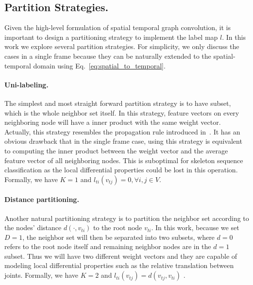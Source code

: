 \documentclass[letterpaper]{article} \usepackage{aaai18}  \usepackage{times}  \usepackage{helvet}  \usepackage{courier}  \usepackage{url}  \usepackage{graphicx}
\begin{document}
\subsection{Partition Strategies.}\label{sec:partition}
Given the high-level formulation of spatial temporal graph convolution, it is important to design a partitioning strategy to implement the label map $ l $.
In this work we explore several partition strategies.
For simplicity, we only discuss the cases in a single frame because they can be naturally extended to the spatial-temporal domain using Eq.~\ref{eq:spatial_to_temporal}.

\paragraph{Uni-labeling.}
The simplest and most straight forward partition strategy is to have subset, which is the whole neighbor set itself.
In this strategy, feature vectors on every neighboring node will have a inner product with the same weight vector. 
Actually, this strategy resembles the propagation rule introduced in~\cite{Kipf2017ICLR}.
It has an obvious drawback that in the single frame case, using this strategy is equivalent to computing the inner product between the weight vector and the average feature vector of all neighboring nodes. 
This is suboptimal for skeleton sequence classification as the local differential properties could be lost in this operation.
Formally, we have $K=1$ and $l_{ti}(v_{tj}) = 0, \forall i,j \in V$.

\paragraph{Distance partitioning.}
Another natural partitioning strategy is to partition the neighbor set according to the nodes' distance $ d(\cdot, v_{ti}) $ to the root node $ v_{ti} $.
In this work, because we set $ D = 1 $, the neighbor set will then be separated into two subsets, where $ d = 0 $ refers to the root node itself and remaining neighbor nodes are in the $d=1$ subset.
Thus we will have two different weight vectors and they are capable of modeling local differential properties such as the relative translation between joints. Formally, we have $K=2$ and
$l_{ti}(v_{tj}) = d(v_{tj}, v_{ti})$ .
\end{document}
